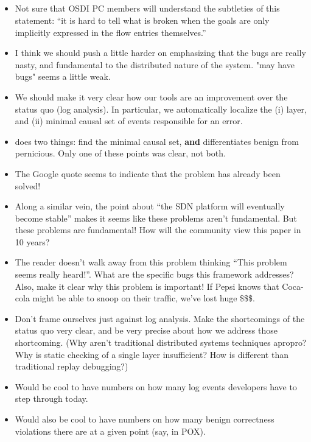 {{\subsection{}
\begin{itemize}
\item Not sure that OSDI PC members will understand the subtleties of this statement: ``it is hard to tell what is broken when the goals are only implicitly expressed in the flow entries themselves.''
\item I think we should push a little harder on emphasizing that the bugs are really nasty, and fundamental to the distributed nature of the system. "may have bugs" seems a little weak.
\item We should make it very clear how our tools are an improvement over the status quo (log analysis). In particular, we automatically localize the (i) layer, and (ii) minimal causal set of events responsible for an error.
\item \simulator{} does two things: find the minimal causal set, {\bf and}
differentiates benign from pernicious. Only one of these points was clear, not
both.
\item The Google quote seems to indicate that the problem has already been solved!
\item Along a similar vein, the point about ``the SDN platform will eventually
become stable'' makes it seems like these problems aren't fundamental. But
these problems are fundamental! How will the community view this paper in 10
years?
\item The reader doesn't walk away from this problem thinking ``This problem
seems really heard!''. What are the specific bugs this framework addresses?
Also, make it clear why this problem is important! If Pepsi knows that
Coca-cola might be able to snoop on their traffic, we've lost huge \$\$\$.
\item Don't frame ourselves just against log analysis. Make
the shortcomings of the status quo very clear, and be very precise about how
we address those shortcoming. (Why aren't traditional distributed systems
techniques apropro? Why is static checking of a single layer insufficient? How
is \simulator{} different than traditional replay debugging?)
\item Would be cool to have numbers on how many log events developers have to
step through today.
\item Would also be cool to have numbers on how many benign correctness violations
there are at a given point (say, in POX).

\end{itemize}}}
